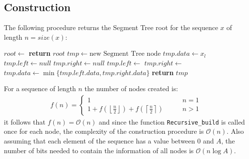 \documentclass{article}
\begin{document}
\subsection{Construction}
The following procedure returns the Segment Tree root for the sequence $x$ of length $n=size(x)$:
    \begin{algorithmic}[1]
        \State $root\gets$
        \State \textbf{return} $root$
    \EndProcedure
    \State
        \State $tmp\gets\text{new Segment Tree node}$
            \State $tmp.data\gets x_l$
            \State $tmp.left\gets null$
            \State $tmp.right\gets null$
        \Else
            \State $tmp.left\gets$
            \State $tmp.right\gets$
            \State $tmp.data\gets\min\{tmp.left.data,tmp.right.data\}$
        \EndIf
        \State \textbf{return} $tmp$
    \EndFunction
    \end{algorithmic}
For a sequence of length $n$ the number of nodes created is:
    \begin{align*}
        f(n)=
        \begin{cases}
            1 \qquad &n=1 \\
            1+f(\left\lfloor{\frac{n}{2}}\right\rfloor)+f(\left\lceil{\frac{n}{2}}\right\rceil) \qquad &n>1
        \end{cases}
    \end{align*}
it follows that $f(n)=\mathcal{O}(n)$ and since the function \texttt{Recursive\_build} is called once for each node, the complexity of the construction procedure is $\mathcal{O}(n)$. Also assuming that each element of the sequence has a value between $0$ and $A$, the number of bits needed to contain the information of all nodes is $\mathcal{O}(n\log{A})$.
\end{document}
